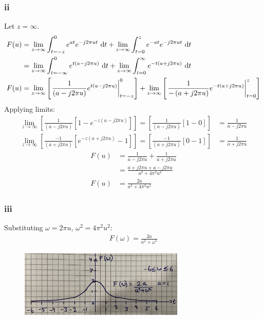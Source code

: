 \documentclass[11pt]{article}
\numberwithin{equation}{section}
\begin{document}
\subsubsection*{ii}
Let $z = \infty$.
\begin{align}
	F(u) &= \lim_{z\rightarrow \infty} \int_{t=-z}^{0}e^{at}e^{-j2\pi u t}  \,\dif t + \lim_{z\rightarrow \infty}\int_{t=0}^{z} e^{-at} e^{-j2\pi u t}\,\dif t\\
	&= \lim_{z\rightarrow \infty} \int_{t=-\infty}^{0}e^{t(a - j2\pi u)}  \,\dif t + \lim_{z\rightarrow \infty} \int_{t=0}^{\infty} e^{-t(a + j2\pi u)}\,\dif t\\
	F(u) &= \lim_{z\rightarrow \infty} \left[ \left. \frac{1}{\left(a - j2\pi u\right)}e^{t\left(a - j2\pi u\right)} \right|_{t = -z}^0 \right] + \lim_{z\rightarrow \infty} \left[ \left. \frac{1}{-\left(a + j2\pi u\right)}e^{-t\left(a + j2\pi u\right)} \right|_{t=0}^z \right]
\end{align}
Applying limits:
\begin{align}
	\lim_{z\rightarrow \infty} \left[ \frac{1}{\left(a - j2\pi u\right)} \left[ 1 - e^{-z\left(a - j2\pi u\right)} \right] \right] = \left[ \frac{1}{\left(a - j2\pi u\right)} \left[ 1 - 0 \right] \right] &= \frac{1}{a - j2\pi u}\\
	\lim_{z\rightarrow \infty} \left[ \frac{-1}{\left(a + j2\pi u\right)} \left[ e^{-z\left( a + j2\pi u\right)} -1 \right]\right] = \left[ \frac{-1}{\left(a + j2\pi u\right)} \left[ 0 -1 \right]\right] &= \frac{1}{a + j2\pi u}
\end{align}
\begin{align}
	F(u) &= \frac{1}{a - j2\pi u} + \frac{1}{a + j2\pi u}\\
	&= \frac{a + j2\pi u + a - j2\pi u}{a^2 + 4\pi^2 u^2}\\
	F(u) &= \frac{2a}{a^2 + 4\pi^2u^2}
\end{align}
\subsubsection*{iii}
Substituting $\omega = 2\pi u$, $\omega^2 = 4\pi^2 u^2$:
\begin{align}
	F(\omega) = \frac{2a}{a^2 + \omega^2}
\end{align}
\begin{figure}[H]
	\centering
	\includegraphics[width = 0.7\textwidth]{./img/q1eiii.JPG}
	\caption{}
\end{figure}
\end{document}
